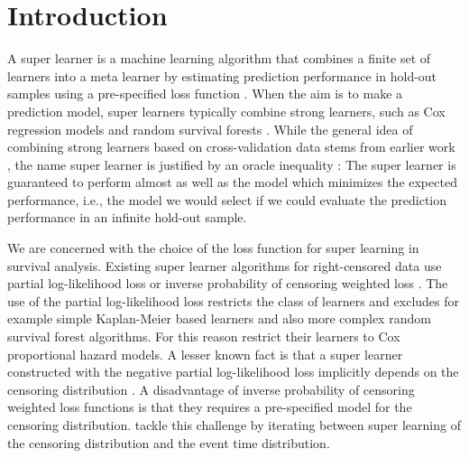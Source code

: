 \documentclass[a4,danish]{article}
\begin{document}


\section{Introduction}
\label{sec:introduction}

A super learner is a machine learning algorithm that combines a finite
set of learners into a meta learner by estimating prediction
performance in hold-out samples using a pre-specified loss function
\citep{van2007super}. When the aim is to make a prediction model,
super learners typically combine strong learners, such as Cox
regression models and random survival forests
\citep{gerds2021medical}.
While the general idea of combining strong learners based on cross-validation
data stems from earlier work \citep{wolpert1992stacked,breiman1996stacked}, the
name super learner is justified by an oracle inequality
\citep{van2003unicv,vaart2006oracle}: The super learner is guaranteed to perform
almost as well as the model which minimizes the expected performance, i.e., the
model we would select if we could evaluate the prediction performance in an
infinite hold-out sample.

We are concerned with the choice of the loss function for super learning in
survival analysis. Existing super learner algorithms for right-censored data use
partial log-likelihood loss or inverse probability of censoring weighted loss
\citep{polley2011-sl-cens,keles2004asymptotically,golmakani2020super,westling2021inference}.
The use of the partial log-likelihood loss restricts the class of learners and
excludes for example simple Kaplan-Meier based learners and also more complex
random survival forest algorithms. For this reason \cite{golmakani2020super}
restrict their learners to Cox proportional hazard models. A lesser known fact
is that a super learner constructed with the negative partial log-likelihood
loss implicitly depends on the censoring distribution
\citep{hjort1992inference,whitney2019comment}. A disadvantage of inverse
probability of censoring weighted loss functions is that they requires a
pre-specified model for the censoring distribution. \cite{westling2021inference}
tackle this challenge by iterating between super learning of the censoring
distribution and the event time distribution.
\end{document}

